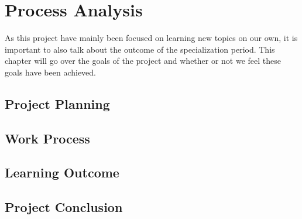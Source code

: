 \chapter{Process Analysis}

As this project have mainly been focused on learning new topics on our own, it is important to also talk about the outcome of the specialization period. This chapter will go over the goals of the project and whether or not we feel these goals have been achieved.

\section{Project Planning}
\label{ProjectPlanning}


\section{Work Process}



\section{Learning Outcome}



\section{Project Conclusion}

